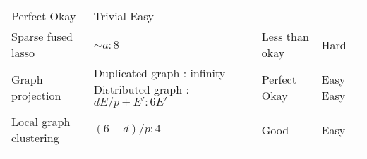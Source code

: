 \documentclass[10pt,oneside]{memoir}
\begin{document}
\begin{longtable}[]{@{}llll@{}}
\begin{minipage}[t]{0.12\columnwidth}
Perfect \linebreak Okay\strut
\end{minipage} & \begin{minipage}[t]{0.14\columnwidth}\raggedright
Trivial \linebreak Easy\strut
\end{minipage}\tabularnewline
\begin{minipage}[t]{0.25\columnwidth}\raggedright
Sparse fused lasso\strut
\end{minipage} & \begin{minipage}[t]{0.37\columnwidth}\raggedright
\(\sim a:8\)\strut
\end{minipage} & \begin{minipage}[t]{0.12\columnwidth}\raggedright
Less than okay\strut
\end{minipage} & \begin{minipage}[t]{0.14\columnwidth}\raggedright
Hard\strut
\end{minipage}\tabularnewline
\begin{minipage}[t]{0.25\columnwidth}\raggedright
Graph projection\strut
\end{minipage} & \begin{minipage}[t]{0.37\columnwidth}\raggedright
Duplicated graph : infinity \linebreak Distributed graph :
\(dE/p + E' : 6E'\)\strut
\end{minipage} & \begin{minipage}[t]{0.12\columnwidth}\raggedright
Perfect \linebreak Okay\strut
\end{minipage} & \begin{minipage}[t]{0.14\columnwidth}\raggedright
Easy \linebreak Easy\strut
\end{minipage}\tabularnewline
\begin{minipage}[t]{0.25\columnwidth}\raggedright
Local graph clustering\strut
\end{minipage} & \begin{minipage}[t]{0.37\columnwidth}\raggedright
\((6 + d)/p : 4\)\strut
\end{minipage} & \begin{minipage}[t]{0.12\columnwidth}\raggedright
Good\strut
\end{minipage} & \begin{minipage}[t]{0.14\columnwidth}\raggedright
Easy\strut
\end{minipage}\tabularnewline
\begin{minipage}[t]{0.25\columnwidth}\raggedright

\end{minipage}
\end{longtable}
\end{document}
